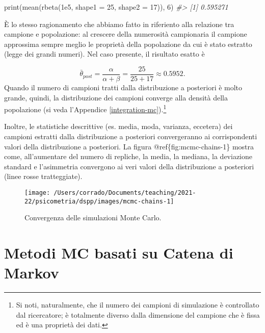 \documentclass[
]{memoir}
\newenvironment{Shaded}{\begin{snugshade}}{\end{snugshade}}
\newcommand{\AttributeTok}[1]{\textcolor[rgb]{0.77,0.63,0.00}{#1}}
\newcommand{\CommentTok}[1]{\textcolor[rgb]{0.56,0.35,0.01}{\textit{#1}}}
\newcommand{\DecValTok}[1]{\textcolor[rgb]{0.00,0.00,0.81}{#1}}
\newcommand{\FloatTok}[1]{\textcolor[rgb]{0.00,0.00,0.81}{#1}}
\newcommand{\FunctionTok}[1]{\textcolor[rgb]{0.00,0.00,0.00}{#1}}
\newcommand{\NormalTok}[1]{#1}
\begin{document}
\begin{Shaded}
\begin{Highlighting}[]
\FunctionTok{print}\NormalTok{(}\FunctionTok{mean}\NormalTok{(}\FunctionTok{rbeta}\NormalTok{(}\FloatTok{1e5}\NormalTok{, }\AttributeTok{shape1 =} \DecValTok{25}\NormalTok{, }\AttributeTok{shape2 =} \DecValTok{17}\NormalTok{)), }\DecValTok{6}\NormalTok{)}
\CommentTok{\#\textgreater{} [1] 0.595271}
\end{Highlighting}
\end{Shaded}

\noindent
È lo stesso ragionamento che abbiamo fatto in riferiento alla relazione tra campione e popolazione: al crescere della numerosità campionaria il campione approssima sempre meglio le proprietà della popolazione da cui è stato estratto (legge dei grandi numeri). Nel caso presente, il risultato esatto è

\[
\bar{\theta}_{post} = \frac{\alpha}{\alpha + \beta} = \frac{25}{25 + 17} \approx 0.5952.
\]
\noindent
Quando il numero di campioni tratti dalla distribuzione a posteriori è molto grande, quindi, la distribuzione dei campioni converge alla densità della popolazione (si veda l'Appendice \ref{integration-mc}).\footnote{Si noti, naturalmente, che il numero dei campioni di simulazione è controllato dal ricercatore; è totalmente diverso dalla dimensione del campione che è fissa ed è una proprietà dei dati.}

Inoltre, le statistiche descrittive (es. media, moda, varianza, eccetera) dei campioni estratti dalla distribuzione a posteriori convergeranno ai corrispondenti valori della distribuzione a posteriori. La figura @ref\{fig:mcmc-chains-1\} mostra come, all'aumentare del numero di repliche, la media, la mediana, la deviazione standard e l'asimmetria convergono ai veri valori della distribuzione a posteriori (linee rosse tratteggiate).

\begin{figure}

{\centering \texttt{[image: /Users/corrado/Documents/teaching/2021-22/psicometria/dspp/images/mcmc-chains-1]} 

}

\caption{Convergenza delle simulazioni Monte Carlo.}\label{fig:mcmc-chains-1}
\end{figure}

\hypertarget{metodi-mc-basati-su-catena-di-markov}{%
\section{Metodi MC basati su Catena di Markov}\label{metodi-mc-basati-su-catena-di-markov}}
\end{document}
